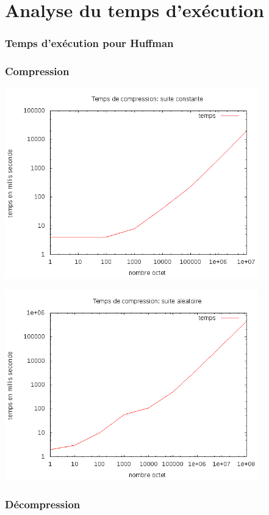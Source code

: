 \documentclass{report}
\begin{document}
\section*{Analyse du temps d’exécution}
\subsubsection*{Temps d’exécution pour Huffman}
\subsubsection*{Compression}

\begin{center}
\includegraphics[width=11cm]{tempsChC.png}
\end{center}
\begin{center}
\includegraphics[width=11cm]{tempsChA.png}
\end{center}

\subsubsection*{Décompression}
 
\end{document}
